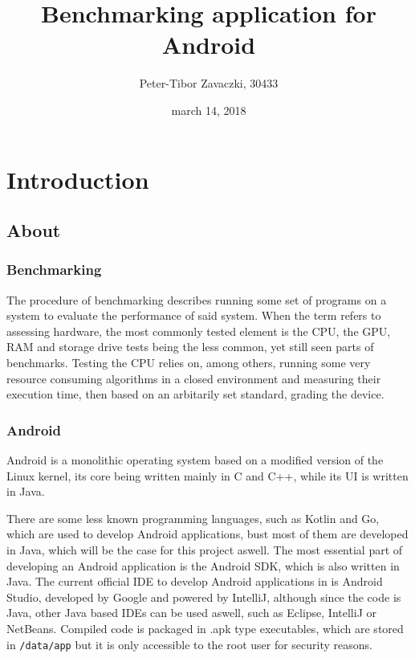 \documentclass[a4paper,10pt]{report}
\title{
Benchmarking application for Android
}
\author{Peter-Tibor Zavaczki, 30433}
\date{march 14, 2018}
\newcommand{\code}{\texttt}
\begin{document}
\maketitle

\chapter{Introduction}
\section{About}
 \subsection{Benchmarking}
 The procedure of benchmarking describes running some set of programs on a system to evaluate the performance of said system. When the term refers to assessing hardware, the most commonly tested element is the CPU, the GPU, RAM and storage drive tests being the less common, yet still seen parts of benchmarks. Testing the CPU relies on, among others, running some very resource consuming algorithms in a closed environment and measuring their execution time, then based on an arbitarily set standard, grading the device.
 \subsection{Android}
 Android is a monolithic operating system based on a modified version of the Linux kernel, its core being written mainly in C and C++, while its UI is written in Java.

 There are some less known programming languages, such as Kotlin and Go, which are used to develop Android applications, bust most of them are developed in Java, which will be the case for this project aswell. The most essential part of developing an Android application is the Android SDK, which is also written in Java. The current official IDE to develop Android applications in is Android Studio, developed by Google and powered by IntelliJ, although since the code is Java, other Java based IDEs can be used aswell, such as Eclipse, IntelliJ or NetBeans. Compiled code is packaged in .apk type executables, which are stored in \code{/data/app} but it is only accessible to the root user for security reasons.

\newpage
\end{document}
